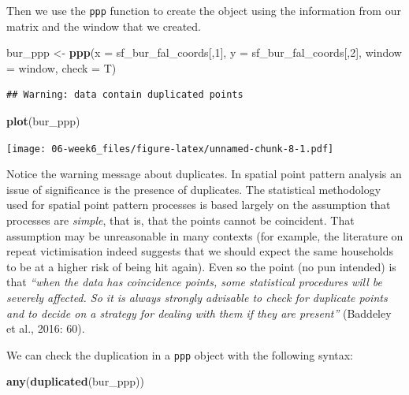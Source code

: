 \documentclass[]{book}
\newenvironment{Shaded}{\begin{snugshade}}{\end{snugshade}}
\newcommand{\DataTypeTok}[1]{\textcolor[rgb]{0.13,0.29,0.53}{#1}}
\newcommand{\DecValTok}[1]{\textcolor[rgb]{0.00,0.00,0.81}{#1}}
\newcommand{\KeywordTok}[1]{\textcolor[rgb]{0.13,0.29,0.53}{\textbf{#1}}}
\newcommand{\NormalTok}[1]{#1}
\newcommand{\StringTok}[1]{\textcolor[rgb]{0.31,0.60,0.02}{#1}}
\begin{document}
Then we use the \texttt{ppp} function to create the object using the information from our matrix and the window that we created.

\begin{Shaded}
\begin{Highlighting}[]
\NormalTok{bur_ppp <-}\StringTok{ }\KeywordTok{ppp}\NormalTok{(}\DataTypeTok{x =}\NormalTok{ sf_bur_fal_coords[,}\DecValTok{1}\NormalTok{], }\DataTypeTok{y =}\NormalTok{ sf_bur_fal_coords[,}\DecValTok{2}\NormalTok{],}
                   \DataTypeTok{window =}\NormalTok{ window, }\DataTypeTok{check =}\NormalTok{ T)}
\end{Highlighting}
\end{Shaded}

\begin{verbatim}
## Warning: data contain duplicated points
\end{verbatim}

\begin{Shaded}
\begin{Highlighting}[]
\KeywordTok{plot}\NormalTok{(bur_ppp)}
\end{Highlighting}
\end{Shaded}

\texttt{[image: 06-week6\_files/figure-latex/unnamed-chunk-8-1.pdf]}

Notice the warning message about duplicates. In spatial point pattern analysis an issue of significance is the presence of duplicates. The statistical methodology used for spatial point pattern processes is based largely on the assumption that processes are \emph{simple}, that is, that the points cannot be coincident. That assumption may be unreasonable in many contexts (for example, the literature on repeat victimisation indeed suggests that we should expect the same households to be at a higher risk of being hit again). Even so the point (no pun intended) is that \emph{``when the data has coincidence points, some statistical procedures will be severely affected. So it is always strongly advisable to check for duplicate points and to decide on a strategy for dealing with them if they are present''} (Baddeley et al., 2016: 60).

We can check the duplication in a \texttt{ppp} object with the following syntax:

\begin{Shaded}
\begin{Highlighting}[]
\KeywordTok{any}\NormalTok{(}\KeywordTok{duplicated}\NormalTok{(bur_ppp))}
\end{Highlighting}
\end{Shaded}
\end{document}
